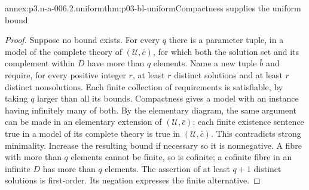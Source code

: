 \begin{annexitem}{annex:p3.n-a-006.2.uniform}{thm:p03-bl-uniform}{Compactness supplies the uniform bound}
\begin{proof}
Suppose no bound exists. For every \(q\) there is a parameter tuple,
in a model of the complete theory of \((\mathcal U,\bar c)\), for which
both the solution set and its complement within \(D\) have more than
\(q\) elements. Name a new tuple \(\bar b\) and require, for every
positive integer \(r\), at least \(r\) distinct solutions and at least
\(r\) distinct nonsolutions. Each finite collection of requirements is
satisfiable, by taking \(q\) larger than all its bounds. Compactness
gives a model with an instance having infinitely many of both. By the
elementary diagram, the same argument can be made in an elementary
extension of \((\mathcal U,\bar c)\): each finite existence sentence true
in a model of its complete theory is true in \((\mathcal U,\bar c)\).
This contradicts strong minimality. Increase the resulting bound if
necessary so it is nonnegative. A fibre with more than \(q\) elements
cannot be finite, so is cofinite; a cofinite fibre in an infinite \(D\)
has more than \(q\) elements. The assertion of at least \(q+1\) distinct
solutions is first-order. Its negation expresses the finite alternative.
\end{proof}
\end{annexitem}

